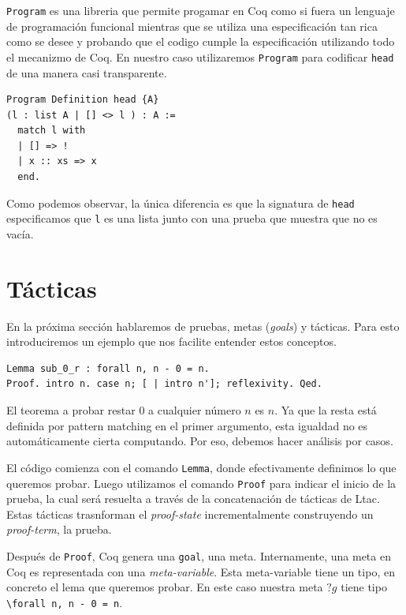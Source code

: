 \lstinline{Program} es una libreria que permite progamar en Coq como si fuera un lenguaje de programación funcional mientras que se utiliza una especificación tan rica como se desee y probando que el codigo cumple la especificación utilizando todo el mecanizmo de Coq. En nuestro caso utilizaremos \lstinline{Program} para codificar \lstinline{head} de una manera casi transparente.
\begin{lstlisting}
Program Definition head {A}
(l : list A | [] <> l ) : A :=
  match l with
  | [] => !
  | x :: xs => x
  end.
\end{lstlisting}
Como podemos observar, la única diferencia es que la signatura de \lstinline{head} especificamos que \lstinline{l} es una lista junto con una prueba que muestra que no es vacía.

\section{Tácticas}

En la próxima sección hablaremos de pruebas, metas (\textit{goals}) y tácticas. Para esto introduciremos un ejemplo que nos facilite entender estos conceptos.

\begin{exmp}\label{exmp:sub_0_r}
\begin{lstlisting}
Lemma sub_0_r : forall n, n - 0 = n.
Proof. intro n. case n; [ | intro n']; reflexivity. Qed. 
\end{lstlisting}
\end{exmp}


El teorema a probar restar 0 a cualquier número $n$ es $n$. Ya que la resta está definida por pattern matching en el primer argumento, esta igualdad no es automáticamente cierta computando. Por eso, debemos hacer análisis por casos.

El código comienza con el comando \lstinline{Lemma}, donde efectivamente definimos lo que queremos probar.
Luego utilizamos el comando \lstinline{Proof} para indicar el inicio de la prueba, la cual será resuelta a través de la concatenación de tácticas de Ltac. Estas tácticas trasnforman el \textit{proof-state} incrementalmente construyendo un \textit{proof-term}, la prueba.

Después de \lstinline{Proof}, Coq genera una \lstinline{goal}, una meta. Internamente, una meta en Coq es representada con una \textit{meta-variable}. Esta meta-variable tiene un tipo, en concreto el lema que queremos probar. En este caso nuestra meta $?g$ tiene tipo \lstinline{\forall n, n - 0 = n}.

